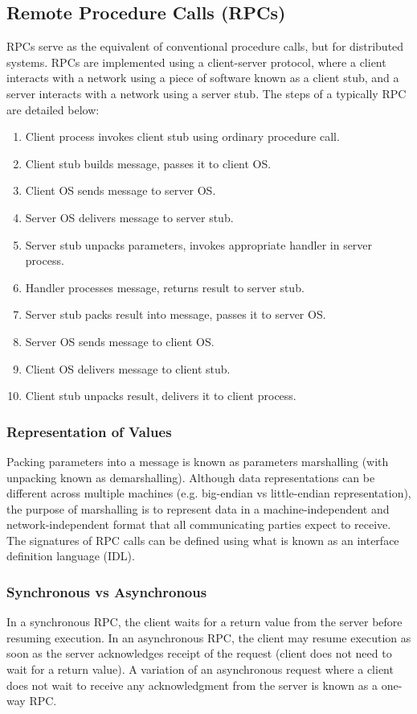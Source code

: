 \documentclass[12pt,titlepage]{article}
\begin{document}
    \subsection{Remote Procedure Calls (RPCs)}
      RPCs serve as the equivalent of conventional procedure calls, but for distributed systems. RPCs are implemented using a client-server protocol, where
      a client interacts with a network using a piece of software known as a client stub, and a server interacts with a network using a server stub. The
      steps of a typically RPC are detailed below:
      \begin{enumerate}
        \item Client process invokes client stub using ordinary procedure call.
        \item Client stub builds message, passes it to client OS.
        \item Client OS sends message to server OS.
        \item Server OS delivers message to server stub.
        \item Server stub unpacks parameters, invokes appropriate handler in server process.
        \item Handler processes message, returns result to server stub.
        \item Server stub packs result into message, passes it to server OS.
        \item Server OS sends message to client OS.
        \item Client OS delivers message to client stub.
        \item Client stub unpacks result, delivers it to client process.
      \end{enumerate}

      \subsubsection{Representation of Values}
        Packing parameters into a message is known as parameters marshalling (with unpacking known as demarshalling). Although data representations can be
        different across multiple machines (e.g. big-endian vs little-endian representation), the purpose of marshalling is to represent data in a
        machine-independent and network-independent format that all communicating parties expect to receive. The signatures of RPC calls can be defined
        using what is known as an interface definition language (IDL).

      \subsubsection{Synchronous vs Asynchronous}
        In a synchronous RPC, the client waits for a return value from the server before resuming execution. In an asynchronous RPC, the client may resume
        execution as soon as the server acknowledges receipt of the request (client does not need to wait for a return value). A variation of an asynchronous
        request where a client does not wait to receive any acknowledgment from the server is known as a one-way RPC.
\end{document}
